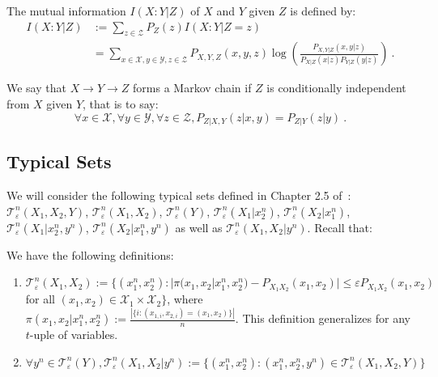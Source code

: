 \begin{definition}
  The mutual information $I(X:Y|Z)$ of $X$ and $Y$ given $Z$ is defined by:
    \begin{equation}
       \begin{aligned}
          I(X:Y|Z) &:= \sum_{z \in \mathcal{Z}}P_Z(z)I(X : Y|Z=z)\\
          &= \sum_{x \in \mathcal{X}, y \in \mathcal{Y}, z \in \mathcal{Z}}P_{X,Y,Z}(x,y,z)\log\left(\frac{P_{X,Y|Z}(x,y|z)}{P_{X|Z}(x|z)P_{Y|Z}(y|z)}\right)\ .
       \end{aligned}
     \end{equation}   
\end{definition}

\begin{definition}
We say that $X \rightarrow Y \rightarrow Z$ forms a Markov chain if $Z$ is conditionally independent from $X$ given $Y$, that is to say:
\[\forall x \in \mathcal{X},\forall y \in \mathcal{Y},\forall z \in \mathcal{Z}, P_{Z|X,Y}(z|x,y) = P_{Z|Y}(z|y)   \ .\]
\end{definition}

\subsection{Typical Sets}
\label{subsection:typicalSets}
We will consider the following typical sets defined in Chapter 2.5 of~\cite{GK11}: $\mathcal{T}^n_{\varepsilon}(X_1,X_2,Y)$, $\mathcal{T}^n_{\varepsilon}(X_1,X_2)$, $\mathcal{T}^n_{\varepsilon}(Y)$, $\mathcal{T}^n_{\varepsilon}(X_1|x_2^n)$, $\mathcal{T}^n_{\varepsilon}(X_2|x_1^n)$, $\mathcal{T}^n_{\varepsilon}(X_1|x_2^n,y^n)$, $\mathcal{T}^n_{\varepsilon}(X_2|x_1^n,y^n)$ as well as $\mathcal{T}^n_{\varepsilon}(X_1,X_2|y^n)$. Recall that:
      \begin{definition}
        We have the following definitions:
        \begin{enumerate}
        \item $\mathcal{T}^n_{\varepsilon}(X_1,X_2) := \{(x_1^n,x_2^n) : |\pi(x_1,x_2|x_1^n,x_2^n) - P_{X_1X_2}(x_1,x_2)|\leq \varepsilon P_{X_1X_2}(x_1,x_2)$ for all $(x_1,x_2) \in \mathcal{X}_1 \times \mathcal{X}_2\}$, where $\pi(x_1,x_2|x_1^n,x_2^n) := \frac{|\{i : (x_{1,i},x_{2,i}) = (x_1,x_2)\}|}{n}$. This definition generalizes for any $t$-uple of variables.
    \item $\forall y^n \in \mathcal{T}^n_{\varepsilon}(Y), \mathcal{T}^n_{\varepsilon}(X_1,X_2|y^n) := \{ (x_1^n,x_2^n) : (x_1^n,x_2^n,y^n) \in \mathcal{T}^n_{\varepsilon}(X_1,X_2,Y) \}$
        \end{enumerate}
      \end{definition}

